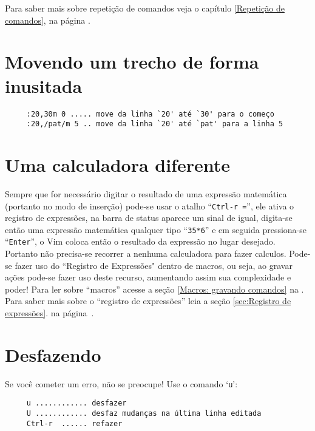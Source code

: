 {\Large {}} Para saber mais sobre repetição de comandos veja o capítulo
\ref{Repetição de comandos}, na página \pageref{Repetição de comandos}.

\section{Movendo um trecho de forma inusitada}
\label{Movendo um trecho de forma inusitada}

\begin{verbatim}
     :20,30m 0 ..... move da linha `20' até `30' para o começo
     :20,/pat/m 5 .. move da linha `20' até `pat' para a linha 5
\end{verbatim}


\section{Uma calculadora diferente}
\label{Uma calculadora diferente}

Sempre que for necessário digitar  o resultado de uma expressão matemática
(portanto no modo de inserção) pode-se usar o atalho ``{\tt Ctrl-r =}'', ele
ativa o registro de expressões, na barra de status aparece um sinal de igual,
digita-se então uma expressão matemática qualquer tipo ``{\tt 35*6}'' e em
seguida pressiona-se ``{\tt Enter}'', o Vim coloca então o resultado da
expressão no lugar desejado.  Portanto não precisa-se recorrer a nenhuma
calculadora para fazer calculos.  Pode-se fazer uso do ``Registro de
Expressões" dentro de macros, ou seja, ao gravar ações pode-se fazer uso deste
recurso, aumentando assim sua complexidade e poder! Para ler sobre ``macros''
acesse a seção \ref{Macros: gravando comandos} na \pageref{Macros: gravando
comandos}.  Para saber mais sobre o ``registro de expressões'' leia a seção
\ref{sec:Registro de expressões}.  na página~\pageref{sec:Registro de
expressões}.

\section{Desfazendo}
\label{Desfazendo}

Se você cometer um erro, não se preocupe! Use o comando `{\tt u}':

\begin{verbatim}
     u ............ desfazer
     U ............ desfaz mudanças na última linha editada
     Ctrl-r  ...... refazer
\end{verbatim}

